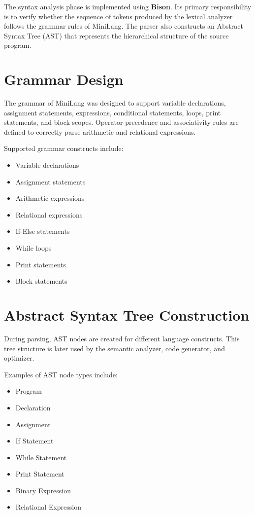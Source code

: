 \documentclass[12pt,a4paper]{report}
\begin{document}
The syntax analysis phase is implemented using \textbf{Bison}. Its primary responsibility is to verify whether the sequence of tokens produced by the lexical analyzer follows the grammar rules of MiniLang. The parser also constructs an Abstract Syntax Tree (AST) that represents the hierarchical structure of the source program.

\section{Grammar Design}

The grammar of MiniLang was designed to support variable declarations, assignment statements, expressions, conditional statements, loops, print statements, and block scopes. Operator precedence and associativity rules are defined to correctly parse arithmetic and relational expressions.

Supported grammar constructs include:

\begin{itemize}
    \item Variable declarations
    \item Assignment statements
    \item Arithmetic expressions
    \item Relational expressions
    \item If-Else statements
    \item While loops
    \item Print statements
    \item Block statements
\end{itemize}

\section{Abstract Syntax Tree Construction}

During parsing, AST nodes are created for different language constructs. This tree structure is later used by the semantic analyzer, code generator, and optimizer.

Examples of AST node types include:

\begin{itemize}
    \item Program
    \item Declaration
    \item Assignment
    \item If Statement
    \item While Statement
    \item Print Statement
    \item Binary Expression
    \item Relational Expression
\end{itemize}
\end{document}
